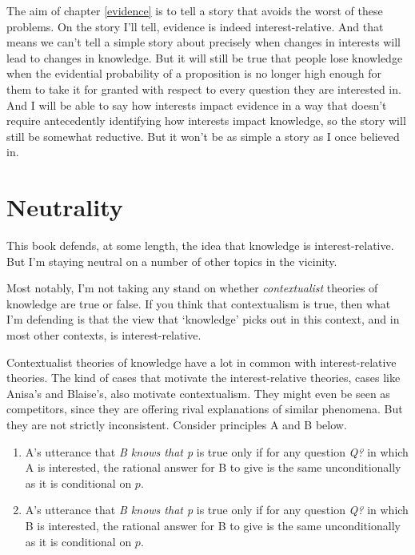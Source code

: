 \documentclass[11pt,]{book}
\providecommand{\tightlist}{%
  \setlength{\itemsep}{0pt}\setlength{\parskip}{0pt}}
\begin{document}
The aim of chapter \ref{evidence} is to tell a story that avoids the worst of these problems. On the story I'll tell, evidence is indeed interest-relative. And that means we can't tell a simple story about precisely when changes in interests will lead to changes in knowledge. But it will still be true that people lose knowledge when the evidential probability of a proposition is no longer high enough for them to take it for granted with respect to every question they are interested in. And I will be able to say how interests impact evidence in a way that doesn't require antecedently identifying how interests impact knowledge, so the story will still be somewhat reductive. But it won't be as simple a story as I once believed in.

\hypertarget{neutrality}{%
\section{Neutrality}\label{neutrality}}

This book defends, at some length, the idea that knowledge is interest-relative. But I'm staying neutral on a number of other topics in the vicinity.

Most notably, I'm not taking any stand on whether \emph{contextualist} theories of knowledge are true or false. If you think that contextualism is true, then what I'm defending is that the view that `knowledge' picks out in this context, and in most other contexts, is interest-relative.

Contextualist theories of knowledge have a lot in common with interest-relative theories. The kind of cases that motivate the interest-relative theories, cases like Anisa's and Blaise's, also motivate contextualism. They might even be seen as competitors, since they are offering rival explanations of similar phenomena. But they are not strictly inconsistent. Consider principles A and B below.

\begin{enumerate}
\def\labelenumi{\Alph{enumi}.}
\tightlist
\item
  A's utterance that \emph{B knows that p} is true only if for any question \emph{Q?} in which A is interested, the rational answer for B to give is the same unconditionally as it is conditional on \(p\).
\item
  A's utterance that \emph{B knows that p} is true only if for any question \emph{Q?} in which B is interested, the rational answer for B to give is the same unconditionally as it is conditional on \(p\).
\end{enumerate}
\end{document}
